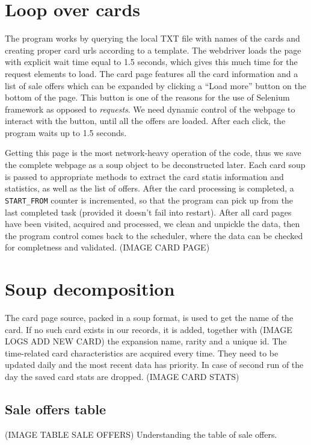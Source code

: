 \section{Loop over cards}
The program works by querying the local TXT file with names of the cards and creating proper card urls according to a template. The webdriver loads the page with explicit wait time equal to 1.5 seconds, which gives this much time for the request elements to load. The card page features all the card information and a list of sale offers which can be expanded by clicking a ``Load more'' button on the bottom of the page. This button is one of the reasons for the use of Selenium framework as opposed to \textit{requests}. We need dynamic control of the webpage to interact with the button, until all the offers are loaded. After each click, the program waits up to 1.5 seconds. \par Getting this page is the most network-heavy operation of the code, thus we save the complete webpage as a soup object to be deconstructed later. Each card soup is passed to appropriate methods to extract the card statis information and statistics, as well as the list of offers. After the card processing is completed, a \texttt{START\_FROM} counter is incremented, so that the program can pick up from the last completed task (provided it doesn't fail into restart). After all card pages have been visited, acquired and processed, we clean and unpickle the data, then the program control comes back to the scheduler, where the data can be checked for completness and validated. (IMAGE CARD PAGE)

\section{Soup decomposition}
The card page source, packed in a soup format, is used to get the name of the card. If no such card exists in our records, it is added, together with (IMAGE LOGS ADD NEW CARD) the expansion name, rarity and a unique id. The time-related card characteristics are acquired every time. They need to be updated daily and the most recent data has priority. In case of second run of the day the saved card stats are dropped.
(IMAGE CARD STATS)

\subsection{Sale offers table}
(IMAGE TABLE SALE OFFERS)
Understanding the table of sale offers.

